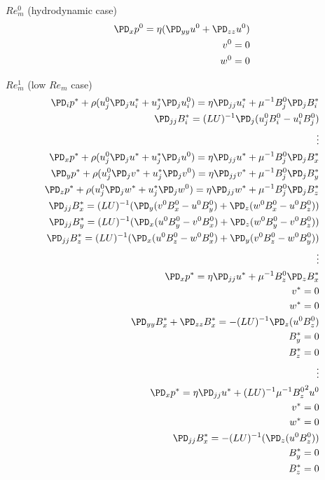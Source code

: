 \documentclass[11pt]{article}
\begin{document}
$Re_m^0$ (hydrodynamic case)
\begin{equation}\begin{aligned}
\PD_x p^0 = \eta (\PD_{yy} u^0 + \PD_{zz} u^0) \\
v^0 = 0 \\
w^0 = 0 \\
\end{aligned}\end{equation}

$Re_m^1$ (low $Re_m$ case)
\begin{equation}\begin{aligned}
\PD_i p^* + \rho (u_j^0 \PD_j u_i^* + u_j^* \PD_j u_i^0) = \eta \PD_{jj} u_i^* + \mu^{-1} B_j^0 \PD_j B_i^* \\
\PD_{jj} B_i^* = (LU)^{-1} \PD_j (u_j^0 B_i^0 - u_i^0 B_j^0) \\
\vdots \\
\PD_x p^* + \rho (u_j^0 \PD_j u^* + u_j^* \PD_j u^0) = \eta \PD_{jj} u^* + \mu^{-1} B_j^0 \PD_j B_x^* \\
\PD_y p^* + \rho (u_j^0 \PD_j v^* + u_j^* \PD_j v^0) = \eta \PD_{jj} v^* + \mu^{-1} B_j^0 \PD_j B_y^* \\
\PD_z p^* + \rho (u_j^0 \PD_j w^* + u_j^* \PD_j w^0) = \eta \PD_{jj} w^* + \mu^{-1} B_j^0 \PD_j B_z^* \\
\PD_{jj} B_x^* = (LU)^{-1} (\PD_y (v^0 B_x^0 - u^0 B_y^0) + \PD_z (w^0 B_x^0 - u^0 B_z^0)) \\
\PD_{jj} B_y^* = (LU)^{-1} (\PD_x (u^0 B_y^0 - v^0 B_x^0) + \PD_z (w^0 B_y^0 - v^0 B_z^0)) \\
\PD_{jj} B_z^* = (LU)^{-1} (\PD_x (u^0 B_z^0 - w^0 B_x^0) + \PD_y (v^0 B_z^0 - w^0 B_y^0)) \\
\vdots \\
\PD_x p^* = \eta \PD_{jj} u^* + \mu^{-1} B_z^0 \PD_z B_x^* \\
v^* = 0 \\
w^* = 0 \\
\PD_{yy} B_x^* + \PD_{zz} B_x^* =-(LU)^{-1} \PD_z (u^0 B_z^0) \\
B_y^* = 0 \\
B_z^* = 0 \\
\vdots \\
\PD_x p^* = \eta \PD_{jj} u^* + (LU)^{-1} \mu^{-1} {B_z^0}^2 u^0 \\
v^* = 0 \\
w^* = 0 \\
\PD_{jj} B_x^* =-(LU)^{-1} (\PD_z (u^0 B_z^0)) \\
B_y^* = 0 \\
B_z^* = 0 \\
\end{aligned}\end{equation}
\end{document}
